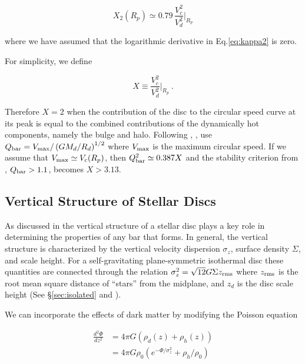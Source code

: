 \begin{equation} \label{eq:x2}
X_2(R_p) \simeq  0.79\,\frac{V_c^2}{V_d^2}\Biggr\rvert_{R_p}
\end{equation}

\noindent where we have assumed that the logarithmic derivative in
Eq.\eqref{eq:kappa2} is zero.

For simplicity, we define

\begin{equation} \label{eq:x}
X \equiv  \frac{V_c^2}{V_d^2}\Biggr\rvert_{R_p}~.
\end{equation}

\noindent Therefore $X=2$ when the contribution of the disc to the
circular speed curve at its peak is equal to the combined
contributions of the dynamically hot components, namely the bulge and
halo.  Following \citet{EfstathiouShotNoise},
\citet{YurinSpringelStellarDisks}, use $Q_{\rm bar} = V_{\rm
  max}/\left (GM_d/R_d\right )^{1/2}$ where $V_{\rm max}$ is the
maximum circular speed.  If we assume that $V_{\rm max}\simeq
V_c(R_p)$, then $Q_{\rm bar}^2 \simeq 0.387 X$ and the stability
criterion from \citet{EfstathiouShotNoise}, $Q_{\rm bar}>1.1$, becomes
$X > 3.13$.

\subsection{Vertical Structure of Stellar Discs}

As discussed in \citet{Klypin2009} the vertical structure of a stellar
disc plays a key role in determining the properties of any bar that
forms.  In general, the vertical structure is characterized by the
vertical velocity dispersion $\sigma_z$, surface density $\Sigma$, and
scale height.  For a self-gravitating plane-symmetric isothermal disc
these quantities are connected through the relation $\sigma_z^2 =
\sqrt{12}G\Sigma z_{\rm rms}$ where $z_{\rm rms}$ is the root mean square distance
of ``stars'' from the midplane, and $z_d$ is the disc scale height (See
\S\ref{sec:isolated} and 
\citet{spitzer1942, camm1950}).

We can incorporate the effects of dark matter by modifying
the Poisson equation

\begin{equation} \label{eq:spitzerpoisson}
\begin{aligned}
\frac{d^2\Phi}{dz^2} & = 4\pi G \left (\rho_d(z) + \rho_h(z) \right )\\
& = 4\pi G\rho_0 \left(e^{-\Phi/\sigma_z^2} + \rho_h/\rho_0\right )
\end{aligned}
\end{equation}

